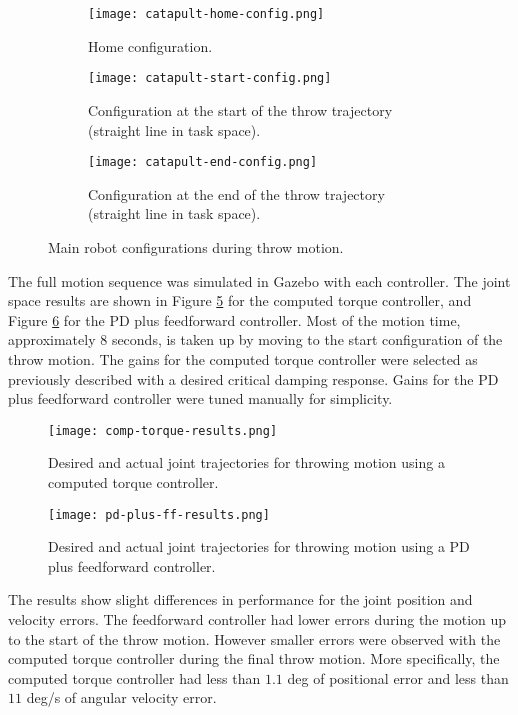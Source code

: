 \documentclass[conference]{IEEEtran}
\begin{document}
\begin{figure}[!t]
  \begin{subfigure}{0.24\textwidth}
    \texttt{[image: catapult-home-config.png]}
    \caption{Home configuration.}
    \label{fig:home-config}
  \end{subfigure}
  \begin{subfigure}{0.24\textwidth}
    \texttt{[image: catapult-start-config.png]}
    \caption{Configuration at the start of the throw trajectory (straight line in task space).}
    \label{fig:start-config}
  \end{subfigure}
  \begin{subfigure}{0.24\textwidth}
    \texttt{[image: catapult-end-config.png]}
    \caption{Configuration at the end of the throw trajectory (straight line in task space).}
    \label{fig:end-config}
  \end{subfigure}
  \caption{Main robot configurations during throw motion.}
  \label{fig:configs}
\end{figure}

The full motion sequence was simulated in Gazebo with each controller. The joint
space results are shown in Figure \ref{fig:comp-torque-results} for the computed
torque controller, and Figure \ref{fig:pd-plus-ff-results} for the PD plus
feedforward controller. Most of the motion time, approximately $8$ seconds, is
taken up by moving to the start configuration of the throw motion. The gains for
the computed torque controller were selected as previously described with a
desired critical damping response. Gains for the PD plus feedforward controller
were tuned manually for simplicity.

\begin{figure}[!t]
  \texttt{[image: comp-torque-results.png]}
  \caption{Desired and actual joint trajectories for throwing motion using a computed torque controller.}
  \label{fig:comp-torque-results}
\end{figure}

\begin{figure}[!t]
  \texttt{[image: pd-plus-ff-results.png]}
  \caption{Desired and actual joint trajectories for throwing motion using a PD plus feedforward controller.}
  \label{fig:pd-plus-ff-results}
\end{figure}

The results show slight differences in performance for the joint position and
velocity errors. The feedforward controller had lower errors during the motion
up to the start of the throw motion. However smaller errors were observed with
the computed torque controller during the final throw motion. More specifically,
the computed torque controller had less than $1.1$ deg of positional error and
less than $11$ deg/s of angular velocity error.
\end{document}
